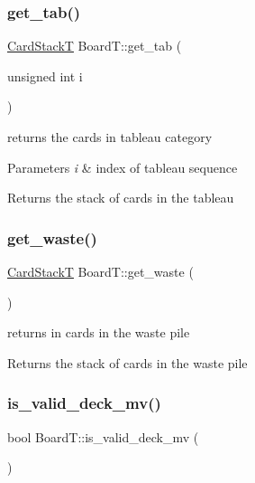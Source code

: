 \subsubsection{\texorpdfstring{get\+\_\+tab()}{get\_tab()}}
{\footnotesize\ttfamily \hyperlink{_card_stack_8h_a29a6854caf5fec306ee8fc0c6b453837}{Card\+StackT} Board\+T\+::get\+\_\+tab (\begin{DoxyParamCaption}\item[{unsigned int}]{i }\end{DoxyParamCaption})}



returns the cards in tableau category 


\begin{DoxyParams}{Parameters}
{\em i} & index of tableau sequence \\
\hline
\end{DoxyParams}
\begin{DoxyReturn}{Returns}
the stack of cards in the tableau 
\end{DoxyReturn}
\mbox{\label{class_board_t_a1e3a7edd2e993d22a453da1487177585}} 
\subsubsection{\texorpdfstring{get\+\_\+waste()}{get\_waste()}}
{\footnotesize\ttfamily \hyperlink{_card_stack_8h_a29a6854caf5fec306ee8fc0c6b453837}{Card\+StackT} Board\+T\+::get\+\_\+waste (\begin{DoxyParamCaption}{ }\end{DoxyParamCaption})}



returns in cards in the waste pile 

\begin{DoxyReturn}{Returns}
the stack of cards in the waste pile 
\end{DoxyReturn}
\mbox{\label{class_board_t_affe6cfc5c246bcfa0afd59476c70db8c}} 
\subsubsection{\texorpdfstring{is\+\_\+valid\+\_\+deck\+\_\+mv()}{is\_valid\_deck\_mv()}}
{\footnotesize\ttfamily bool Board\+T\+::is\+\_\+valid\+\_\+deck\+\_\+mv (\begin{DoxyParamCaption}{ }\end{DoxyParamCaption})}



